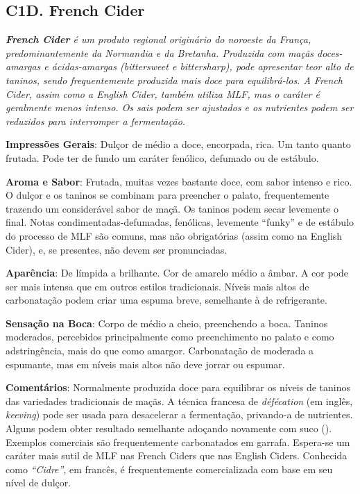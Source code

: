 \subsection*{C1D. French Cider}

\textit{\textbf{French Cider} é um produto regional originário do noroeste da França, predominantemente da Normandia e da Bretanha. Produzida com maçãs doces-amargas e ácidas-amargas (\textit{bittersweet} e \textit{bittersharp}), pode apresentar teor alto de taninos, sendo frequentemente produzida mais doce para equilibrá-los. A French Cider, assim como a English Cider, também utiliza MLF, mas o caráter é geralmente menos intenso. Os sais podem ser ajustados e os nutrientes podem ser reduzidos para interromper a fermentação.}

\textbf{Impressões Gerais}: Dulçor de médio a doce, encorpada, rica. Um tanto quanto frutada. Pode ter de fundo um caráter fenólico, defumado ou de estábulo.

\textbf{Aroma e Sabor}: Frutada, muitas vezes bastante doce, com sabor intenso e rico. O dulçor e os taninos se combinam para preencher o palato, frequentemente trazendo um considerável sabor de maçã. Os taninos podem secar levemente o final. Notas condimentadas-defumadas, fenólicas, levemente “funky” e de estábulo do processo de MLF são comuns, mas não obrigatórias (assim como na English Cider), e, se presentes, não devem ser pronunciadas.

\textbf{Aparência}: De límpida a brilhante. Cor de amarelo médio a âmbar. A cor pode ser mais intensa que em outros estilos tradicionais. Níveis mais altos de carbonatação podem criar uma espuma breve, semelhante à de refrigerante.

\textbf{Sensação na Boca}: Corpo de médio a cheio, preenchendo a boca. Taninos moderados, percebidos principalmente como preenchimento no palato e como adstringência, mais do que como amargor. Carbonatação de moderada a espumante, mas em níveis mais altos não deve jorrar ou espumar.

\textbf{Comentários}: Normalmente produzida doce para equilibrar os níveis de taninos das variedades tradicionais de maçãs. A técnica francesa de \textit{défécation} (em inglês, \textit{keeving}) pode ser usada para desacelerar a fermentação, privando-a de nutrientes. Alguns podem obter resultado semelhante adoçando novamente com suco (). Exemplos comerciais são frequentemente carbonatados em garrafa. Espera-se um caráter mais sutil de MLF nas French Ciders que nas English Ciders. Conhecida como \textit{“Cidre”}, em francês, é frequentemente comercializada com base em seu nível de dulçor.

